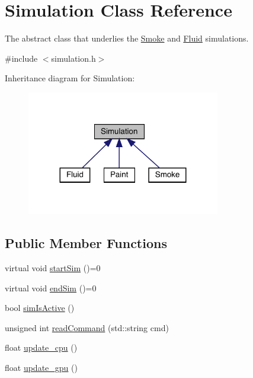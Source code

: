 \hypertarget{classSimulation}{}\section{Simulation Class Reference}
\label{classSimulation}


The abstract class that underlies the \mbox{\hyperlink{classSmoke}{Smoke}} and \mbox{\hyperlink{classFluid}{Fluid}} simulations.  




{\ttfamily \#include $<$simulation.\+h$>$}



Inheritance diagram for Simulation\+:\nopagebreak
\begin{figure}[H]
\begin{center}
\leavevmode
\includegraphics[width=239pt]{classSimulation__inherit__graph}
\end{center}
\end{figure}
\subsection*{Public Member Functions}
\begin{DoxyCompactItemize}
\item 
virtual void \mbox{\hyperlink{classSimulation_ac523544ffc2b4cffed1d2a6ead5809b1}{start\+Sim}} ()=0
\item 
virtual void \mbox{\hyperlink{classSimulation_ab496d124202f55e741db7db9a304a7ee}{end\+Sim}} ()=0
\item 
bool \mbox{\hyperlink{classSimulation_a0b951a01d3de845823d2a87b0d50adef}{sim\+Is\+Active}} ()
\item 
unsigned int \mbox{\hyperlink{classSimulation_a04cafb2071be521281c2584fa300b912}{read\+Command}} (std\+::string cmd)
\item 
float \mbox{\hyperlink{classSimulation_a36aefdee44fabe9b8070363ca9eb80a7}{update\+\_\+cpu}} ()
\item 
float \mbox{\hyperlink{classSimulation_a16ab6b7e3c5936bae78fc8c2daf658d2}{update\+\_\+gpu}} ()
\end{DoxyCompactItemize}

